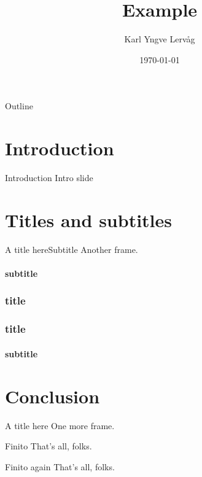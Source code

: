 \documentclass{beamer}
\title{Example}
\author{Karl Yngve Lervåg}
\date{\today}
\begin{document}
\begin{frame}{Outline}
  \tableofcontents
\end{frame}

\section{Introduction}
\begin{frame}{Introduction}
  Intro slide
\end{frame}

\section{Titles and subtitles}
\begin{frame}{A title here}{Subtitle}
  Another frame.
\end{frame}

\begin{frame}
  \framesubtitle{subtitle}
  \frametitle{title}
\end{frame}

\begin{frame}
  \frametitle{title}
\end{frame}

\begin{frame}
  \framesubtitle{subtitle}
\end{frame}

\section{Conclusion}
\begin{frame}{A title here}
  One more frame.
\end{frame}
\begin{frame}{Finito}
  That's all, folks.
\end{frame}
\begin{frame}[fragile]{Finito again}
  That's all, folks.
\end{frame}
\end{document}
